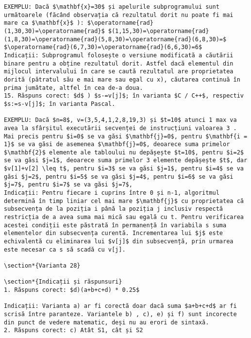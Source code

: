 \begin{verbatim}
EXEMPLU: Dacă $\mathbf{x}=30$ și apelurile subprogramului sunt următoarele (făcând observația că rezultatul dorit nu poate fi mai mare ca $\mathbf{x}$ ): $\operatorname{rad}(1,30,30)=\operatorname{rad}$ $(1,15,30)=\operatorname{rad}(1,8,30)=\operatorname{rad}(5,8,30)=\operatorname{rad}(6,8,30)=$ $\operatorname{rad}(6,7,30)=\operatorname{rad}(6,6,30)=6$
Indicații: Subprogramul folosește o versiune modificată a căutării binare pentru a obține rezultatul dorit. Astfel dacă elementul din mijlocul intervalului în care se caută rezultatul are proprietatea dorită (pătratul său e mai mare sau egal cu x), căutarea continuă în prima jumătate, altfel în cea de-a doua.
15. Răspuns corect: $d$ ) $s-=v[j]$; în varianta $C / C++$, respectiv $s:=s-v[j]$; în varianta Pascal.

EXEMPLU: Dacă $n=8$, v=(3,5,4,1,2,8,19,3) și $t=10$ atunci 1 max va avea la sfârșitul executării secvenței de instrucțiuni valoarea 3 . Mai precis pentru $i=0$ se va găsi $\mathbf{j}=0$, pentru $\mathbf{i = 1}$ se va găsi de asemenea $\mathbf{j}=0$, deoarece suma primelor $\mathbf{2}$ elemente ale tabloului nu depășește $t=10$, pentru $i=2$ se va găsi $j=1$, deoarece suma primelor 3 elemente depășește $t$, dar $v[1]+v[2] \leq t$, pentru $i=3$ se va găsi $j=1$, pentru $i=4$ se va găsi $j=2$, pentru $i=5$ se va găsi $j=4$, pentru $i=6$ se va găsi $j=7$, pentru $i=7$ se va găsi $j=7$,
Indicații: Pentru fiecare i cuprins între 0 și n-1, algoritmul determină în timp liniar cel mai mare $\mathbf{j}$ cu proprietatea că subsecvența de la poziția i până la poziția j inclusiv respectă restricția de a avea suma mai mică sau egală cu t. Pentru verificarea acestei condiții este păstrată în permanență în variabila s suma elementelor din subsecvența curentă. Incrementarea lui $j$ este echivalentă cu eliminarea lui $v[j]$ din subsecvență, prin urmarea este necesar ca s să scadă cu v[j].

\section*{Varianta 28}

\section*{Indicații și răspunsuri}
1. Răspuns corect: $d)(a+b+c+d) * 0.25$

Indicații: Varianta a) ar fi corectă doar dacă suma $a+b+c+d$ ar fi scrisă între paranteze. Variantele b) , c), e) și f) sunt incorecte din punct de vedere matematic, deși nu au erori de sintaxă.
2. Răspuns corect: c) Atât S1, cât și S2


\end{verbatim}
